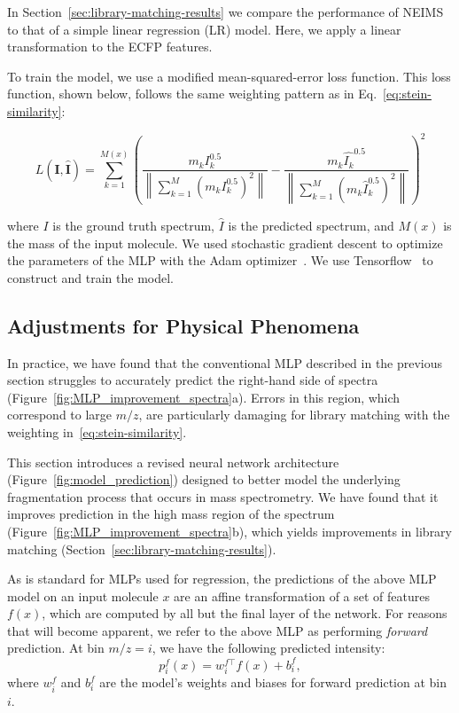 \documentclass{article}
\begin{document}
In Section~\ref{sec:library-matching-results} we compare the performance of NEIMS to that of a simple linear regression (LR) model. Here, we apply a linear transformation to the ECFP features.

To train the model, we use a modified mean-squared-error loss function. This loss function, shown below, follows the same weighting pattern as in Eq.~\ref{eq:stein-similarity}:

\begin{equation}\label{eq:training_loss}
    L(\boldsymbol{I}, \hat{\boldsymbol{I}}) = \sum_{k=1}^{M(x)} \left(\frac{m_k I_k^{0.5}}{\left\lVert\sum_{k=1}^{M} (m_{k} I_{k}^{0.5})^2\right\rVert} - \frac{m_k \hat{I_k}^{0.5}}{\left\lVert\sum_{k=1}^{M} (m_{k} \hat{I}_{k}^{0.5})^2\right\rVert}\right)^2
\end{equation}

where $I$ is the ground truth spectrum, $\hat{I}$ is the predicted spectrum, and $M(x)$ is the mass of the input molecule. 
We used stochastic gradient descent to optimize the parameters of the MLP with the Adam optimizer~\cite{Kingma_adam_optimizer}. We use Tensorflow~\cite{Tensorflow-2016} to construct and train the model.

\subsection{Adjustments for Physical Phenomena}\label{sec:ms_physical_phenomena}

In practice, we have found that the conventional MLP described in the previous section struggles to accurately predict the right-hand side of spectra (Figure~\ref{fig:MLP_improvement_spectra}a). Errors in this region, which correspond to large $m/z$, are particularly damaging for library matching with the weighting in~\eqref{eq:stein-similarity}.

This section introduces a revised neural network architecture (Figure~\ref{fig:model_prediction}) designed to better model the underlying fragmentation process that occurs in mass spectrometry. We have found that it improves prediction in the high mass region of the spectrum (Figure~\ref{fig:MLP_improvement_spectra}b), which yields improvements in library matching (Section~\ref{sec:library-matching-results}). 

As is standard for MLPs used for regression, the predictions of the above MLP model on an input molecule $x$ are an affine transformation of a set of features $f(x)$, which are computed by all but the final layer of the network. For reasons that will become apparent, we refer to the above MLP as performing \textit{forward} prediction. At bin $m/z = i$, we have the following predicted intensity:
\begin{equation}
p^f_i(x) = w^{f\top}_i f(x) + b^f_i, \label{eq:pred-i}
\end{equation}
where $w^f_i$ and $b^f_i$ are the model's weights and biases for forward prediction at bin $i$. 
\end{document}
